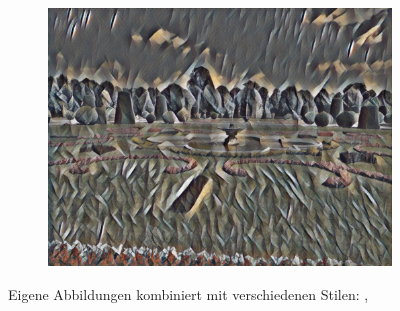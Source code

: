 \begin{figure}[H]
\begin{subfigure}[h]{0.32\textwidth}
        \includegraphics[width=\textwidth]{resources/content/experiments/garden-vgg16_still_life_with_liqueur_bottle.jpg}
    \end{subfigure}

    \caption{Eigene Abbildungen kombiniert mit verschiedenen Stilen: \cite{multicolored_abstract_artwork_img}, \cite{still_life_with_liqueur_bottle_img}}
    \label{img:trained_models2}
\end{figure}



